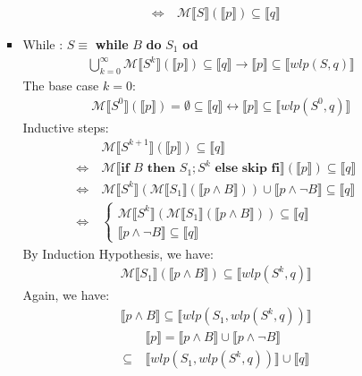\documentclass[11pt]{article}
\begin{document}
\begin{enumerate}
\begin{enumerate}
\begin{itemize}
\begin{align*}
						\Leftrightarrow ~& \mathcal{M} \llbracket S \rrbracket(\llbracket p \rrbracket) \subseteq \llbracket q \rrbracket
					\end{align*}
				\item While : $S\equiv$ \textbf{while} $B$ \textbf{do} $S_{1}$ \textbf{od}\\
					\begin{align*}
						& \bigcup_{k=0}^{\infty} \mathcal{M} \llbracket S^{k} \rrbracket(\llbracket p \rrbracket) \subseteq \llbracket q \rrbracket \to \llbracket p \rrbracket \subseteq \llbracket wlp(S, q) \rrbracket
					\end{align*}
					The base case $k=0$:
					\begin{align*}
						& \mathcal{M} \llbracket S^{0} \rrbracket(\llbracket p \rrbracket) = \emptyset \subseteq \llbracket q \rrbracket \leftrightarrow  \llbracket p \rrbracket \subseteq \llbracket wlp(S^{0}, q) \rrbracket
					\end{align*}
					Inductive steps:
					\begin{align*}
						& \mathcal{M} \llbracket S^{k+1} \rrbracket(\llbracket p \rrbracket) \subseteq \llbracket q \rrbracket\\
						\Leftrightarrow ~& \mathcal{M} \llbracket \textbf{if } B \textbf{ then } S_{1};S^{k} \textbf{ else skip fi} \rrbracket(\llbracket p \rrbracket) \subseteq \llbracket q \rrbracket\\
						\Leftrightarrow ~& \mathcal{M} \llbracket S^{k}\rrbracket(\mathcal{M} \llbracket S_{1}\rrbracket(\llbracket p \land B \rrbracket)) \cup \llbracket p \land \neg B \rrbracket \subseteq \llbracket q \rrbracket\\
						\Leftrightarrow ~& \begin{cases}
							\mathcal{M} \llbracket S^{k}\rrbracket(\mathcal{M} \llbracket S_{1}\rrbracket(\llbracket p \land B \rrbracket)) \subseteq \llbracket q \rrbracket\\
							\llbracket p \land \neg B \rrbracket \subseteq \llbracket q \rrbracket
						\end{cases}
					\end{align*}
					By Induction Hypothesis, we have:
					\begin{align*}
						\mathcal{M}\llbracket S_{1} \rrbracket(\llbracket p \land B \rrbracket) \subseteq \llbracket wlp(S^{k}, q) \rrbracket
					\end{align*}
					Again, we have:
					\begin{align*}
						\llbracket p \land B \rrbracket \subseteq \llbracket wlp(S_{1}, wlp(S^{k}, q)) \rrbracket
					\end{align*}
					\begin{align*}
						& \llbracket p \rrbracket = \llbracket p \land B \rrbracket \cup \llbracket p \land \neg B \rrbracket\\
						\subseteq ~& \llbracket wlp(S_{1}, wlp(S^{k}, q)) \rrbracket \cup \llbracket q \rrbracket
					\end{align*}
			\end{itemize}



\end{enumerate}
\end{enumerate}
\end{document}
